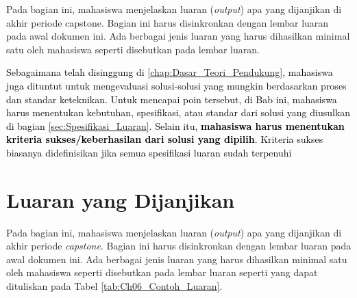 Pada bagian ini, mahasiswa menjelaskan luaran (\textit{output}) apa yang dijanjikan di akhir periode capstone. Bagian ini harus disinkronkan dengan lembar luaran pada awal dokumen ini. Ada berbagai jenis luaran yang harus dihasilkan minimal satu oleh mahasiswa seperti disebutkan pada lembar luaran.

\textcolor{black}{Sebagaimana telah disinggung di \ref{chap:Dasar_Teori_Pendukung}, mahasiswa juga dituntut untuk mengevaluasi solusi-solusi yang mungkin berdasarkan proses dan standar keteknikan. Untuk mencapai poin tersebut, di Bab ini, mahasiswa harus menentukan kebutuhan, spesifikasi, atau standar dari solusi yang diusulkan di bagian \ref{sec:Spesifikasi_Luaran}. Selain itu, \textbf{mahasiswa harus menentukan kriteria sukses/keberhasilan dari solusi yang dipilih}. Kriteria sukses biasanya didefinisikan jika semua spesifikasi luaran sudah terpenuhi} 

\section{Luaran yang Dijanjikan}
\label{sec:Luaran_yang_Dijanjikan}

    Pada bagian ini, mahasiswa menjelaskan luaran (\textit{output}) apa yang dijanjikan di akhir periode \textit{capstone}. Bagian ini harus disinkronkan dengan lembar luaran pada awal dokumen ini. Ada berbagai jenis luaran yang harus dihasilkan minimal satu oleh mahasiswa seperti disebutkan pada lembar luaran seperti yang dapat dituliskan pada Tabel \ref{tab:Ch06_Contoh_Luaran}.
    
